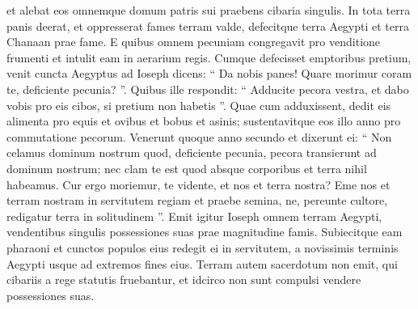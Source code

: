 \begin{biblechapter}
\begin{biblechapter}
\begin{biblechapter}
\begin{biblechapter}
\begin{biblechapter}
\begin{biblechapter}
\begin{biblechapter}
\begin{biblechapter}
\begin{biblechapter}
\begin{biblechapter}
\begin{biblechapter}
\begin{biblechapter}
\begin{biblechapter}
\begin{biblechapter}
\begin{biblechapter}
\begin{biblechapter}
\begin{biblechapter}
\begin{biblechapter}
\begin{biblechapter}
\begin{biblechapter}
\begin{biblechapter}
\begin{biblechapter}
\begin{biblechapter}
\begin{biblechapter}
\begin{biblechapter}
\begin{biblechapter}
\begin{biblechapter}
\begin{biblechapter}
\begin{biblechapter}
\begin{biblechapter}
\begin{biblechapter}
\begin{biblechapter}
\begin{biblechapter}
\begin{biblechapter}
\begin{biblechapter}
\begin{biblechapter}
\begin{biblechapter}
\begin{biblechapter}
\begin{biblechapter}
\begin{biblechapter}
\begin{biblechapter}
\begin{biblechapter}
\begin{biblechapter}
\begin{biblechapter}
\begin{biblechapter}
\begin{biblechapter}
\begin{biblechapter}
\verse et alebat eos omnemque domum patris sui praebens cibaria singulis.
 \verse In tota terra panis deerat, et oppresserat fames terram valde, defecitque terra Aegypti et terra Chanaan prae fame. 
\verse E quibus omnem pecuniam congregavit pro venditione frumenti et intulit eam in aerarium regis.
 \verse Cumque defecisset emptoribus pretium, venit cuncta Aegyptus ad Ioseph dicens: “ Da nobis panes! Quare morimur coram te, deficiente pecunia? ”. 
\verse Quibus ille respondit: “ Adducite pecora vestra, et dabo vobis pro eis cibos, si pretium non habetis ”. 
\verse Quae cum adduxissent, dedit eis alimenta pro equis et ovibus et bobus et asinis; sustentavitque eos illo anno pro commutatione pecorum.
 \verse Venerunt quoque anno secundo et dixerunt ei: “ Non celamus dominum nostrum quod, deficiente pecunia, pecora transierunt ad dominum nostrum; nec clam te est quod absque corporibus et terra nihil habeamus. 
\verse Cur ergo moriemur, te vidente, et nos et terra nostra? Eme nos et terram nostram in servitutem regiam et praebe semina, ne, pereunte cultore, redigatur terra in solitudinem ”.
 \verse Emit igitur Ioseph omnem terram Aegypti, vendentibus singulis possessiones suas prae magnitudine famis. Subiecitque eam pharaoni 
\verse et cunctos populos eius redegit ei in servitutem, a novissimis terminis Aegypti usque ad extremos fines eius. 
\verse Terram autem sacerdotum non emit, qui cibariis a rege statutis fruebantur, et idcirco non sunt compulsi vendere possessiones suas.

\end{biblechapter}
\end{biblechapter}
\end{biblechapter}
\end{biblechapter}
\end{biblechapter}
\end{biblechapter}
\end{biblechapter}
\end{biblechapter}
\end{biblechapter}
\end{biblechapter}
\end{biblechapter}
\end{biblechapter}
\end{biblechapter}
\end{biblechapter}
\end{biblechapter}
\end{biblechapter}
\end{biblechapter}
\end{biblechapter}
\end{biblechapter}
\end{biblechapter}
\end{biblechapter}
\end{biblechapter}
\end{biblechapter}
\end{biblechapter}
\end{biblechapter}
\end{biblechapter}
\end{biblechapter}
\end{biblechapter}
\end{biblechapter}
\end{biblechapter}
\end{biblechapter}
\end{biblechapter}
\end{biblechapter}
\end{biblechapter}
\end{biblechapter}
\end{biblechapter}
\end{biblechapter}
\end{biblechapter}
\end{biblechapter}
\end{biblechapter}
\end{biblechapter}
\end{biblechapter}
\end{biblechapter}
\end{biblechapter}
\end{biblechapter}
\end{biblechapter}
\end{biblechapter}
